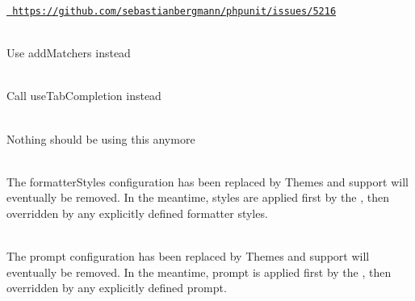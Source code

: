 \begin{DoxyRefList}
\label{deprecated__deprecated000245}%
%
\href{https://github.com/sebastianbergmann/phpunit/issues/5216}{\texttt{ https\+://github.\+com/sebastianbergmann/phpunit/issues/5216}} 
\item[Member \doxylink{class_psy_1_1_configuration_a5e9a9ce029afe384edab3529fc9435f1}{Psy\textbackslash{}Configuration\+::add\+Tab\+Completion\+Matchers} (array \$matchers)]\hfill \\
\label{deprecated__deprecated000256}%
%
Use {\ttfamily add\+Matchers} instead 
\item[Member \doxylink{class_psy_1_1_configuration_aa0c697598417a18db5ba2664cfcf2b3d}{Psy\textbackslash{}Configuration\+::get\+Tab\+Completion} ()]\hfill \\
\label{deprecated__deprecated000254}%
%
Call {\ttfamily use\+Tab\+Completion} instead  
\item[Member \doxylink{class_psy_1_1_configuration_aee0f3f8314a71eb3476a6504aabe8e5b}{Psy\textbackslash{}Configuration\+::get\+Tab\+Completion\+Matchers} ()]\hfill \\
\label{deprecated__deprecated000255}%
%
Nothing should be using this anymore  
\item[Member \doxylink{class_psy_1_1_configuration_a9aeddc179b87dd6847d4846c33962a9c}{Psy\textbackslash{}Configuration\+::set\+Formatter\+Styles} (array \$formatter\+Styles)]\hfill \\
\label{deprecated__deprecated000258}%
%
The {\ttfamily formatter\+Styles} configuration has been replaced by Themes and support will eventually be removed. In the meantime, styles are applied first by the , then overridden by any explicitly defined formatter styles.  
\item[Member \doxylink{class_psy_1_1_configuration_a1c9c58a5250d25bcfcbc8efd8b580c72}{Psy\textbackslash{}Configuration\+::set\+Prompt} (string \$prompt)]\hfill \\
\label{deprecated__deprecated000257}%
%
The {\ttfamily prompt} configuration has been replaced by Themes and support will eventually be removed. In the meantime, prompt is applied first by the , then overridden by any explicitly defined prompt. 
\item[Member \doxylink{class_psy_1_1_configuration_ae6f562d80cfe9b82f4b715e6134abf42}{Psy\textbackslash{}Configuration\+::set\+Tab\+Completion} (bool \$use\+Tab\+Completion)]\hfill \\

\end{DoxyRefList}
